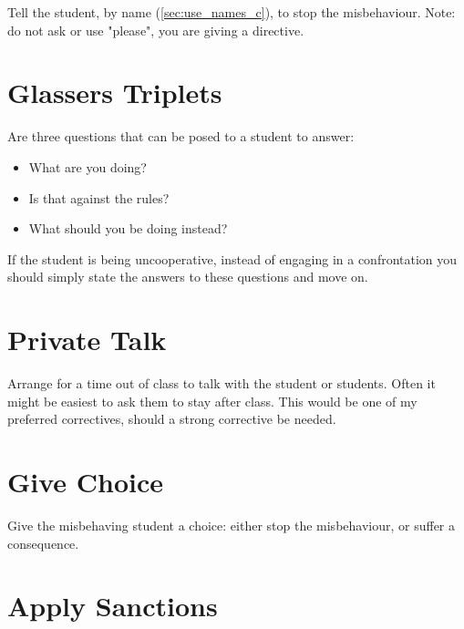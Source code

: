 \documentclass[12pt]{report}
\begin{document}
Tell the student, by name (\ref{sec:use_names_c}), to stop the misbehaviour. Note: do not ask or use "please", you are giving a directive\footnotemark[\value{footnote}].



\section{Glassers Triplets}
\label{sec:glassers_triplets_c}

Are three questions that can be posed to a student to answer:
\begin{itemize}
  \item What are you doing?
  \item Is that against the rules?
  \item What should you be doing instead?
\end{itemize}
If the student is being uncooperative, instead of engaging in a confrontation 
you should simply state the answers to these questions and move on\footnotemark[\value{footnote}].



\section{Private Talk}
\label{sec:private_talk_c}

Arrange for a time out of class to talk with the student or students. Often it might be easiest to ask them to stay after class\footnotemark[\value{footnote}]. This would be one of my preferred correctives, should a strong corrective be needed. 



\section{Give Choice}
\label{sec:give_choice_c}

Give the misbehaving student a choice: either stop the misbehaviour, or suffer a consequence. 

\section{Apply Sanctions}
\label{sec:sanctions_c}
\end{document}
